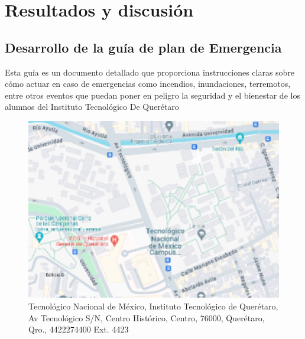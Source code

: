     
    \section{Resultados y discusión}
    
    
    \subsection{Desarrollo de la guía de plan de Emergencia}
    Esta guía es un documento detallado que proporciona instrucciones claras sobre cómo actuar en caso de emergencias como incendios, inundaciones, terremotos, entre otros eventos que puedan poner en peligro la seguridad y el bienestar de los alumnos del Instituto Tecnológico De Querétaro
    
    \begin{figure}[H]
        \centering
        \includegraphics[scale=0.1]{9/Img/mapaItq.pdf}
        \caption{Tecnológico Nacional de México, Instituto Tecnológico de Querétaro, Av Tecnológico S/N, Centro Histórico, Centro, 76000, Querétaro, Qro., 4422274400 Ext. 4423}
        \label{fig:mapa-itq}
    \end{figure}
     
